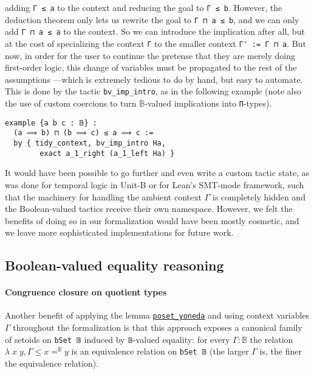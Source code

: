 \documentclass[sigplan,10pt,review, anonymous]{acmart}
\newcommand{\B}{\mathbb{B}}
\newcommand{\lil}{\lstinline}
\theoremstyle{definition}
\begin{document}
adding \lstinline{Γ ≤ a} to the context and reducing the goal to \lstinline{Γ ≤ b}. However, the deduction theorem only lets us rewrite the goal to \lstinline{Γ ⊓ a ≤ b}, and we can only add \lstinline{Γ ⊓ a ≤ a} to the context.
So we can introduce the implication after all, but at the cost of specializing the context \lstinline{Γ} to the smaller context \lstinline{Γ' := Γ ⊓ a}.
But now, in order for the user to continue the pretense that they are merely doing first-order logic, this change of variables must be propagated to the rest of the assumptions%
---which is extremely tedious to do by hand, but easy to automate.
This is done by the tactic \lil{bv_imp_intro}, as in the following example (note also the use of custom coercions to turn \(\B\)-valued implications into \lil{Π}-types).
\begin{lstlisting}
example {a b c : 𝔹} :
  (a ⟹ b) ⊓ (b ⟹ c) ≤ a ⟹ c :=
  by { tidy_context, bv_imp_intro Ha,
        exact a_1_right (a_1_left Ha) }
\end{lstlisting}

It would have been possible to go further and even write a custom tactic state,
as was done for temporal logic in Unit-B \cite{Hudon2015TheUM} or for Lean's SMT-mode framework,
such that the machinery for handling the ambient context \(\Gamma\) is completely hidden and the Boolean-valued tactics receive their own namespace.
However, we felt the benefits of doing so in our formalization would have been mostly cosmetic, and we leave more sophisticated implementations for future work.

\subsection{Boolean-valued equality reasoning}

\paragraph{Congruence closure on quotient types} \label{subsect:bv-cc}
Another benefit of applying the lemma \hyperref[poset-yoneda]{\lstinline{poset_yoneda}} and using context variables \(\Gamma\) throughout the formalization is that this approach exposes a canonical family of setoids on \lil{bSet 𝔹} induced by \lil{𝔹}-valued equality:
for every \(\Gamma : \mathbb{B}\) the relation \(\lambda\; x \; y, \Gamma \leq x =^{\mathbb{B}} y\) is an equivalence relation on \lil{bSet 𝔹} (the larger \(\Gamma\) is, the finer the equivalence relation).
\end{document}
